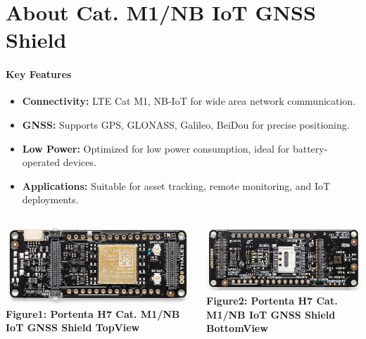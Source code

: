 \section{About Cat. M1/NB IoT GNSS Shield}
{
	\framesubtitle{Key Features}
\begin{itemize}
	\item \textbf{Connectivity:} LTE Cat M1, NB-IoT for wide area network communication.
	\item \textbf{GNSS:} Supports GPS, GLONASS, Galileo, BeiDou for precise positioning.
	\item \textbf{Low Power:} Optimized for low power consumption, ideal for battery-operated devices.
	\item \textbf{Applications:} Suitable for asset tracking, remote monitoring, and IoT deployments.
\end{itemize}
}

{
\begin{columns}
	\centering
	\includegraphics[width=\textwidth]{images/IOTShieldTop.png}
	\vspace{0.2cm}
	\textbf{Figure1: Portenta H7 Cat. M1/NB IoT GNSS Shield TopView} \cite{ArduinoIOTGNSSstore:2024}
	
	\centering
	\includegraphics[width=\textwidth]{images/IOTShieldBottom.png}
	\vspace{0.2cm}
	\textbf{Figure2: Portenta H7 Cat. M1/NB IoT GNSS Shield BottomView} \cite{ArduinoIOTGNSSstore:2024}
\end{columns}
}


